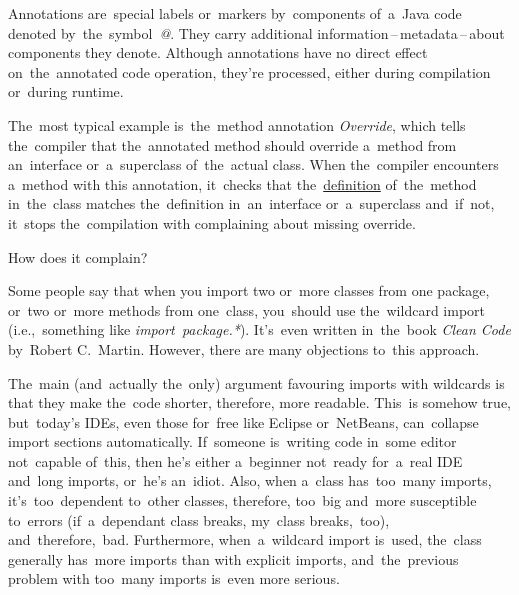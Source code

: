 \label{javaannotation}
Annotations are~special labels or~markers by~components of~a~Java code denoted by~the~symbol~\textquotesingle\textit{@}\textquotesingle. They carry additional information\,--\,metadata\,--\,about components they denote. Although annotations have no direct effect on~the~annotated code operation, they're processed, either during compilation or~during runtime.

The~most typical example is~the~method annotation \textit{Override}, which tells the~compiler that the~annotated method should override a~method from an~interface or~a~superclass of~the~actual class. When the~compiler encounters a~method with this annotation, it~checks that the~\hyperref[declarationdefinition]{definition} of~the~method in~the~class matches the~definition in~an~interface or~a~superclass and~if~not, it~stops the~compilation with complaining about missing override.

\todo How does it complain?

\label{annotationsrepeatable}

\label{javathread}

\label{javathreadsafety}


\label{reflection}

\label{accessmodifiers}

Some people say that when you import two or~more classes from one package, or~two or~more methods from one~class, you~should use the~wildcard import (i.e.,~something like \textit{import~package.*}). It's~even written in~the~book \textit{Clean Code} by~Robert C.~Martin. However, there are many objections to~this approach.

The~main (and~actually the~only) argument favouring imports with wildcards is that they make the~code shorter, therefore, more readable. This~is somehow true, but~today's IDEs, even those for~free like Eclipse or~NetBeans, can~collapse import sections automatically. If~someone is~writing code in~some editor not~capable of~this, then he's either a~beginner not~ready for~a~real IDE and~long imports, or~he's an~idiot. Also, when a~class has~too~many imports, it's~too~dependent to~other classes, therefore, too~big and~more susceptible to~errors (if~a~dependant class breaks, my~class breaks,~too), and~therefore,~bad. Furthermore, when~a~wildcard import is~used, the~class generally has~more imports than with explicit imports, and~the~previous problem with too~many imports is~even more serious.

